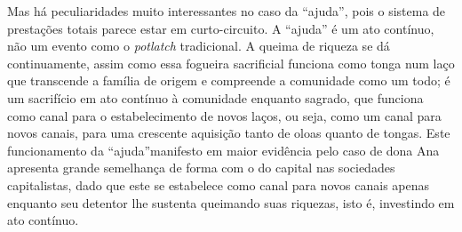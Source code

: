 Mas há peculiaridades muito interessantes no caso da \enquote{ajuda}, pois o sistema de prestações totais parece estar em curto-circuito.
A \enquote{ajuda} é um ato contínuo, não um evento como o \textit{potlatch} tradicional.
A queima de riqueza se dá continuamente, assim como essa fogueira sacrificial funciona como tonga num laço que transcende a família de origem e compreende a comunidade como um todo;
é um sacrifício em ato contínuo à comunidade enquanto sagrado, que funciona como canal para o estabelecimento de novos laços, ou seja, como um canal para novos canais, para uma crescente aquisição tanto de oloas quanto de tongas.
Este funcionamento da \enquote{ajuda}manifesto em maior evidência pelo caso de dona Ana apresenta grande semelhança de forma com o do capital nas sociedades capitalistas, dado que este se estabelece como canal para novos canais apenas enquanto seu detentor lhe sustenta queimando suas riquezas, isto é, investindo em ato contínuo.


